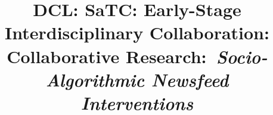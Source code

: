 \documentclass{nsf_proposal}
\title{
    \raggedright
    \large
    {\bf DCL: SaTC: Early-Stage Interdisciplinary Collaboration: Collaborative Research:}~{\it Socio-Algorithmic Newsfeed Interventions}
    \vspace{-1in}
}
\begin{document}




\setcounter{page}{1}
\renewcommand{\thepage} {B--\arabic{page}}
\newpage



\newpage
{}
\renewcommand{\thepage}{D--\arabic{page}}


\newpage
{}
\renewcommand{\thepage}{E--\arabic{page}}


% 
% 

\newpage
{}
\renewcommand{\thepage} {G--\arabic{page}}


%
% 
% 

\newpage
{}
\renewcommand{\thepage} {I--\arabic{page}}

\end{document}
